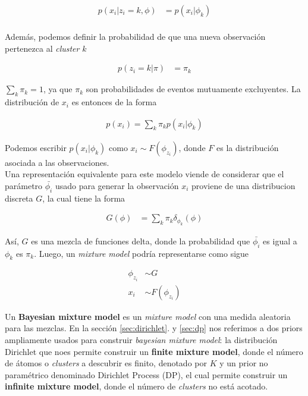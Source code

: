 \documentclass[letterpaper,12pt,oneside]{book} %
\begin{document}
\begin{align}
    p(x_{i}|z_{i}=k, \phi) & = p(x_{i}|\phi_{k})\\
\end{align}

Además, podemos definir la probabilidad de que una nueva observación pertenezca al \textit{cluster} $k$ 

\begin{align}
    p(z_{i}=k|\pi) & = \pi_{k}
\end{align}

$\sum_{k}\pi_{k} = 1$, ya que $\pi_{k}$ son probabilidades de eventos mutuamente excluyentes. La distribución de $x_{i}$ es entonces de la forma

\begin{align}
    p(x_{i}) = \sum_{k}\pi_{k}p(x_{i}|\phi_{k})
\end{align}

Podemos escribir $p(x_{i}|\phi_{k})$ como $x_{i} \sim F(\phi_{z_{i}})$, donde $F$ es la distribución asociada a las observaciones. \\

Una representación equivalente para este modelo viende de considerar que el parámetro $\bar{\phi_{i}}$ usado para generar la observación $x_{i}$ proviene de una distribucion discreta $G$, la cual tiene la forma

\begin{align}
    G(\phi) & = \sum_{k} \pi_{k}\delta_{\phi_{k}}(\phi)
\end{align}

Así, $G$ es una mezcla de funciones delta, donde la probabilidad que $\bar{\phi_{i}}$ es igual a $\phi_{k}$ es $\pi_{k}$. Luego, un \textit{mixture model} podría representarse como sigue

\begin{align}
\phi_{z_{i}} & \sim G\\
x_{i} & \sim  F(\phi_{z_{i}})
\end{align}

Un \textbf{Bayesian mixture model} es un \textit{mixture model} con una medida aleatoria para las mezclas. En la sección \ref{sec:dirichlet}. y \ref{sec:dp} nos referimos a dos priors ampliamente usados para construir \textit{bayesian mixture model}: la distribución Dirichlet que noes permite construir un \textbf{finite mixture model}, donde el número de átomos o \textit{clusters} a descubrir es finito, denotado por $K$ y un prior no paramétrico denominado Dirichlet Process (DP), el cual permite construir un \textbf{infinite mixture model}, donde el número de \textit{clusters} no está acotado. 
\end{document}
